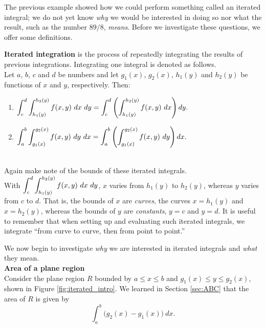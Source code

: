 The previous example showed how we could perform something called an iterated integral; we do not yet know \textit{why} we would be interested in doing so nor what the result, such as the number $89/8$, \textit{means}. Before we investigate these questions, we offer some definitions.

{\textbf{Iterated integration} is the process of repeatedly integrating the results of previous integrations. Integrating one integral is denoted as follows.\\

Let $a$, $b$, $c$ and $d$ be numbers and let $g_1(x)$, $g_2(x)$, $h_1(y)$ and $h_2(y)$ be functions of $x$ and $y$, respectively. Then:
\begin{enumerate}
	\item $\displaystyle \int_c^d\int_{h_1(y)}^{h_2(y)} f(x,y)\ dx\ dy = \int_c^d\left(\int_{h_1(y)}^{h_2(y)} f(x,y)\ dx\right) dy.$
	\item $\displaystyle \int_a^b\int_{g_1(x)}^{g_2(x)} f(x,y)\ dy\ dx = \int_a^b\left(\int_{g_1(x)}^{g_2(x)} f(x,y)\ dy\right) dx.$
\end{enumerate}
}\\

Again make note of the bounds of these iterated integrals.\\
With $\displaystyle \int_c^d\int_{h_1(y)}^{h_2(y)} f(x,y)\ dx\ dy$, $x$ varies from $h_1(y)$ to $h_2(y)$, whereas $y$ varies from $c$ to $d$. That is, the bounds of $x$ are \textit{curves}, the curves $x=h_1(y)$ and $x=h_2(y)$, whereas the bounds of $y$ are \textit{constants}, $y=c$ and $y=d$. It is useful to remember that when setting up and evaluating such iterated integrals, we integrate ``from curve to curve, then from point to point.''

We now begin to investigate \textit{why} we are interested in iterated integrals and \textit{what} they mean.\\

\noindent\textbf{\large Area of a plane region}\\

Consider the plane region $R$ bounded by $a\leq x\leq b$ and $g_1(x)\leq y\leq g_2(x)$, shown in Figure \ref{fig:iterated_intro}. We learned in Section \ref{sec:ABC} that the area of $R$ is given by 
$$\int_a^b \big(g_2(x)-g_1(x)\big)\ dx.$$


